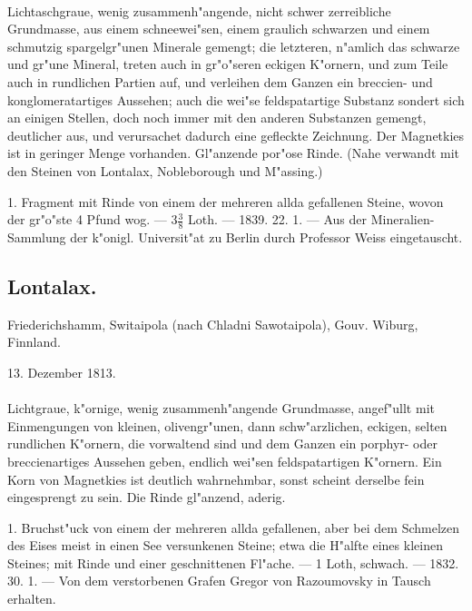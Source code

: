 \documentclass[a4paper, 11pt, oneside, polutonikogreek, german]{article}
\begin{document}
\paragraph{}
Lichtaschgraue, wenig zusammenh"angende, nicht schwer zerreibliche Grundmasse, aus einem schneewei"sen, einem graulich schwarzen und einem schmutzig spargelgr"unen Minerale gemengt; die letzteren, n"amlich das schwarze und gr"une Mineral, treten auch in gr"o"seren eckigen K"ornern, und zum Teile auch in rundlichen Partien auf, und verleihen dem Ganzen ein breccien- und konglomeratartiges Aussehen; auch die wei"se feldspatartige Substanz sondert sich an einigen Stellen, doch noch immer mit den anderen Substanzen gemengt, deutlicher aus, und verursachet dadurch eine gefleckte Zeichnung. Der Magnetkies ist in geringer Menge vorhanden. Gl"anzende por"ose Rinde. (Nahe verwandt mit den Steinen von Lontalax, Nobleborough und M"assing.)

1. Fragment mit Rinde von einem der mehreren allda gefallenen Steine, wovon der gr"o"ste 4 Pfund wog. --- $3\frac{3}{8}$ Loth. --- 1839. 22. 1. --- Aus der Mineralien-Sammlung der k"onigl. Universit"at zu Berlin durch Professor Weiss eingetauscht.
\subsection{Lontalax.}
\begin{center}
\small
Friederichshamm, Switaipola (nach Chladni Sawotaipola), Gouv. Wiburg, Finnland.

13. Dezember 1813.
\end{center}
\paragraph{}
Lichtgraue, k"ornige, wenig zusammenh"angende Grundmasse, angef"ullt mit Einmengungen von kleinen, olivengr"unen, dann schw"arzlichen, eckigen, selten rundlichen K"ornern, die vorwaltend sind und dem Ganzen ein porphyr- oder breccienartiges Aussehen geben, endlich wei"sen feldspatartigen K"ornern. Ein Korn von Magnetkies ist deutlich wahrnehmbar, sonst scheint derselbe fein eingesprengt zu sein. Die Rinde gl"anzend, aderig.

1. Bruchst"uck von einem der mehreren allda gefallenen, aber bei dem Schmelzen des Eises meist in einen See versunkenen Steine; etwa die H"alfte eines kleinen Steines; mit Rinde und einer geschnittenen Fl"ache. --- 1 Loth, schwach. --- 1832. 30. 1. --- Von dem verstorbenen Grafen Gregor von Razoumovsky in Tausch erhalten.
\end{document}
